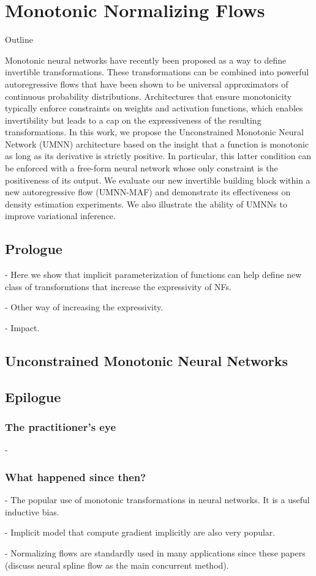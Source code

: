 \chapter{Monotonic Normalizing Flows}\label{ch:05}

\begin{remark}{Outline}

Monotonic neural networks have recently been proposed as a way to define invertible transformations.
These transformations can be combined into powerful autoregressive flows that have been shown to be universal approximators of continuous probability distributions.
Architectures that ensure monotonicity typically enforce constraints on weights and activation functions, which enables invertibility but leads to a cap on the expressiveness of the resulting transformations.
In this work, we propose the Unconstrained Monotonic Neural Network (UMNN) architecture based on the insight that a function is monotonic as long as its derivative is strictly positive. In particular, this latter condition can be enforced with a free-form neural network whose only constraint is the positiveness of its output.
We evaluate our new invertible building block within a new autoregressive flow (UMNN-MAF) and demonstrate its effectiveness on density estimation experiments.
We also illustrate the ability of UMNNs to improve variational inference.
\end{remark}

\section{Prologue}
- Here we show that implicit parameterization of functions can help define new class of transformtions that increase the expressivity of NFs.

- Other way of increasing the expressivity.

- Impact.

\section{Unconstrained Monotonic Neural Networks}


\section{Epilogue}

\subsection{The practitioner's eye}
-

\subsection{What happened since then?}
- The popular use of monotonic transformations in neural networks. It is a useful inductive bias.

- Implicit model that compute gradient implicitly are also very popular.

- Normalizing flows are standardly used in many applications since these papers (discuss neural spline flow as the main concurrent method).
